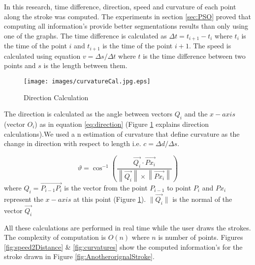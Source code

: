  
 In this research, time difference, direction, speed and curvature of each point along the stroke was computed. The experiments in section \ref{sec:PSO} proved that computing all information's provide better segmentations results than only using one of the graphs. The time difference is calculated as $\Delta t = t_{i+1} - t_i$ where $t_i$ is the time of the point $i$ and $t_{i+1}$ is the time of the point $i+1$. The speed is calculated using equation $v=\Delta s/\Delta t$ where $t$ is the time difference between two points and $s$ is the length between them. 
 
\begin{figure}
	\centering
		\texttt{[image: images/curvatureCal.jpg.eps]}
	\caption{Direction Calculation}
	\label{fig:curvatureCal.jpg}
\end{figure}

  The direction is calculated as the angle between vectors $Q_i$ and the $x-axis$ (vector $O_i$) as in equation \ref{eq:direction} (Figure \ref{fig:curvatureCal.jpg} explains direction calculations).We used a n estimation of curvature that define curvature as the change in direction with respect to length i.e. $c= \Delta d/\Delta s$.
  
 \begin{equation}
\label{eq:direction}
	\vartheta  = \cos ^{ - 1} \left( {\frac{{\overrightarrow {Q_i}  \cdot \overrightarrow {Px_i } }}{{\left\| {\overrightarrow {Q_i} } \right\| \times \left\| {\overrightarrow {Px_i} } \right\|}}} \right)
\end{equation}
where $Q_i=\overrightarrow {P_{i - 1} P_i }$ is the vector from the point  $P_{i - 1}$ to point $P_i$ and $Px_i$ represent the $x-axis$ at this point (Figure \ref{fig:curvatureCal.jpg}).  $\|{\overrightarrow {Q_i }}\|$ is the normal of the  vector $\overrightarrow{Q_i}$
 
 
 
 All these calculations are performed in real time while the user draws the strokes. The complexity of computation is $O(n)$ where $n$ is number of points. Figures \ref{fig:speed2Distance} \&  \ref{fig:curvatures} show the computed information's for the stroke drawn in Figure \ref{fig:AnotherorignalStroke}.%

